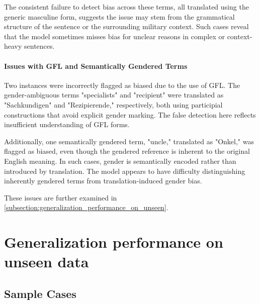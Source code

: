     The consistent failure to detect bias across these terms, all translated using the generic masculine form, suggests the issue may stem from the grammatical structure of the sentence or the surrounding military context. Such cases reveal that the model sometimes misses bias for unclear reasons in complex or context-heavy sentences.

    \paragraph{Issues with GFL and Semantically Gendered Terms}

    Two instances were incorrectly flagged as biased due to the use of GFL. The gender-ambiguous terms "specialists" and "recipient" were translated as "Sachkundigen" and "Rezipierende," respectively, both using participial constructions that avoid explicit gender marking. The false detection here reflects insufficient understanding of GFL forms.

    Additionally, one semantically gendered term, "uncle," translated as "Onkel," was flagged as biased, even though the gendered reference is inherent to the original English meaning. In such cases, gender is semantically encoded rather than introduced by translation. The model appears to have difficulty distinguishing inherently gendered terms from translation-induced gender bias.

    These issues are further examined in \autoref{subsection:generalization_performance_on_unseen}.

\section{Generalization performance on unseen data} \label{subsection:generalization_performance_on_unseen}

    \subsection{Sample Cases}


